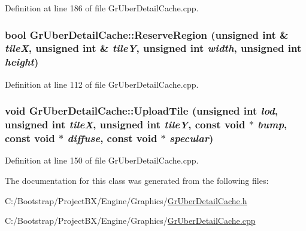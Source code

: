 Definition at line 186 of file GrUberDetailCache.cpp.\hypertarget{class_gr_uber_detail_cache_68e9bc8e181ee380c287e4c0c4a4ad41}{
\subsubsection[{ReserveRegion}]{\setlength{\rightskip}{0pt plus 5cm}bool GrUberDetailCache::ReserveRegion (unsigned int \& {\em tileX}, \/  unsigned int \& {\em tileY}, \/  unsigned int {\em width}, \/  unsigned int {\em height})}}
\label{class_gr_uber_detail_cache_68e9bc8e181ee380c287e4c0c4a4ad41}




Definition at line 112 of file GrUberDetailCache.cpp.\hypertarget{class_gr_uber_detail_cache_85a556efeacb9a9b2e9b2eb74bded94c}{
\subsubsection[{UploadTile}]{\setlength{\rightskip}{0pt plus 5cm}void GrUberDetailCache::UploadTile (unsigned int {\em lod}, \/  unsigned int {\em tileX}, \/  unsigned int {\em tileY}, \/  const void $\ast$ {\em bump}, \/  const void $\ast$ {\em diffuse}, \/  const void $\ast$ {\em specular})}}
\label{class_gr_uber_detail_cache_85a556efeacb9a9b2e9b2eb74bded94c}




Definition at line 150 of file GrUberDetailCache.cpp.

The documentation for this class was generated from the following files:\begin{CompactItemize}
\item 
C:/Bootstrap/ProjectBX/Engine/Graphics/\hyperlink{_gr_uber_detail_cache_8h}{GrUberDetailCache.h}\item 
C:/Bootstrap/ProjectBX/Engine/Graphics/\hyperlink{_gr_uber_detail_cache_8cpp}{GrUberDetailCache.cpp}\end{CompactItemize}
